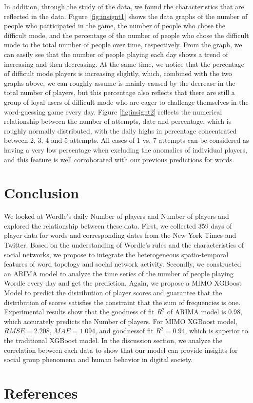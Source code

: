 \documentclass[a4paper]{jpconf}
\begin{document}
In addition, through the study of the data, we found the characteristics that are reflected in the data. Figure \ref{fig:insignt1} shows the data graphs of the number of people who participated in the game, the number of people who chose the difficult mode, and the percentage of the number of people who chose the difficult mode to the total number of people over time, respectively. From the graph, we can easily see that the number of people playing each day shows a trend of increasing and then decreasing. At the same time, we notice that the percentage of difficult mode players is increasing slightly, which, combined with the two graphs above, we can roughly assume is mainly caused by the decrease in the total number of players, but this percentage also reflects that there are still a group of loyal users of difficult mode who are eager to challenge themselves in the word-guessing game every day. Figure \ref{fig:insignt2} reflects the numerical relationship between the number of attempts, date and percentage, which is roughly normally distributed, with the daily highs in percentage concentrated between 2, 3, 4 and 5 attempts. All cases of 1 vs. 7 attempts can be considered as having a very low percentage when excluding the anomalies of individual players, and this feature is well corroborated with our previous predictions for words.


\section{Conclusion}
We looked at Wordle's daily Number of players and Number of players and explored the relationship between these data. First, we collected 359 days of player data for words and corresponding dates from the New York Times and Twitter. Based on the understanding of Wordle's rules and the characteristics of social networks, we propose to integrate the heterogeneous spatio-temporal features of word topology and social network activity. Secondly, we constructed an ARIMA model to analyze the time series of the number of people playing Wordle every day and get the prediction. Again, we propose a MIMO XGBoost Model to predict the distribution of player scores and guarantee that the distribution of scores satisfies the constraint that the sum of frequencies is one. Experimental results show that the goodness of fit $R^2$ of ARIMA model is 0.98, which accurately predicts the Number of players. For MIMO XGBoost model, $RMSE=2.208$, $MAE=1.094$, and goodnessof fit $R^2=0.94$, which is superior to the traditional XGBoost model. In the discussion section, we analyze the correlation between each data to show that our model can provide insights for social group phenomena and human behavior in digital society.

\section*{References}

{}
\end{document}

